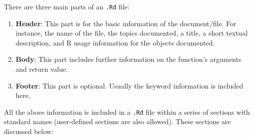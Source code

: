 \documentclass[
]{book}
\begin{document}
There are three main parts of an \texttt{.Rd} file:

\begin{enumerate}
\def\labelenumi{\arabic{enumi}.}
\item
  \textbf{Header}: This part is for the basic information of the document/file. For instance, the name of the file, the topics documented, a title, a short textual description, and R usage information for the objects documented.
\item
  \textbf{Body}: This part includes further information on the function's arguments and return value.
\item
  \textbf{Footer}: This part is optional. Usually the keyword information is included here.
\end{enumerate}

All the above information is included in a \texttt{.Rd} file within a series of sections with standard names (user-defined sections are also allowed). These sections are discussed below:
\end{document}
